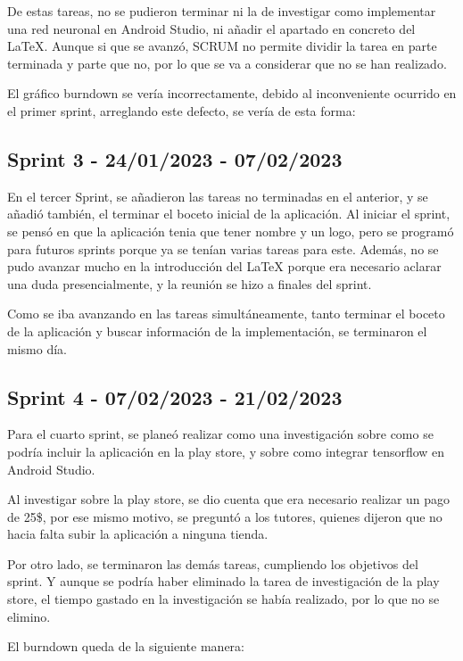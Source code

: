 De estas tareas, no se pudieron terminar ni la de investigar como implementar una red neuronal en Android Studio, ni añadir el apartado en concreto del LaTeX. Aunque si que se avanzó, SCRUM no permite dividir la tarea en parte terminada y parte que no, por lo que se va a considerar que no se han realizado.

El gráfico burndown se vería incorrectamente, debido al inconveniente ocurrido en el primer sprint, arreglando este defecto, se vería de esta forma:

\subsection{Sprint 3 - 24/01/2023 - 07/02/2023}
En el tercer Sprint, se añadieron las tareas no terminadas en el anterior, y se añadió también, el terminar el boceto inicial de la aplicación.
Al iniciar el sprint, se pensó en que la aplicación tenia que tener nombre y un logo, pero se programó para futuros sprints porque ya se tenían varias tareas para este.
Además, no se pudo avanzar mucho en la introducción del LaTeX porque era necesario aclarar una duda presencialmente, y la reunión se hizo a finales del sprint.

Como se iba avanzando en las tareas simultáneamente, tanto terminar el boceto de la aplicación y buscar información de la implementación, se terminaron el mismo día.
\subsection{Sprint 4 - 07/02/2023 - 21/02/2023}
Para el cuarto sprint, se planeó realizar como una investigación sobre como se podría incluir la aplicación en la play store, y sobre como integrar tensorflow en Android Studio.

Al investigar sobre la play store, se dio cuenta que era necesario realizar un pago de 25\$, por ese mismo motivo, se preguntó a los tutores, quienes dijeron que no hacia falta subir la aplicación a ninguna tienda.

Por otro lado, se terminaron las demás tareas, cumpliendo los objetivos del sprint. Y aunque se podría haber eliminado la tarea de investigación de la play store, el tiempo gastado en la investigación se había realizado, por lo que no se elimino.

El burndown queda de la siguiente manera:

